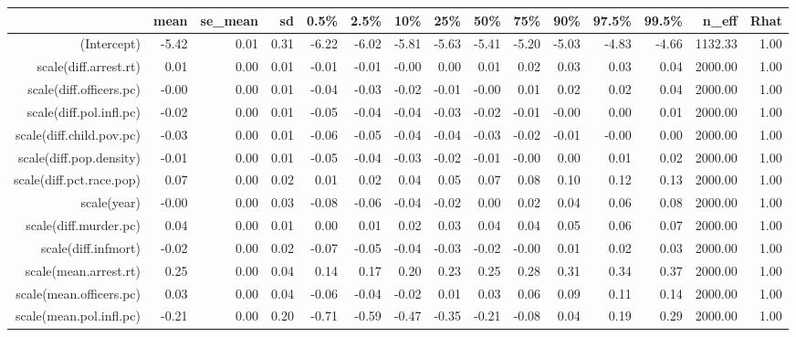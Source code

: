 \begin{table}[ht]
\centering
\begin{tabular}{rrrrrrrrrrrrrrr}
  \hline
 & mean & se\_mean & sd & 0.5\% & 2.5\% & 10\% & 25\% & 50\% & 75\% & 90\% & 97.5\% & 99.5\% & n\_eff & Rhat \\ 
  \hline
(Intercept) & -5.42 & 0.01 & 0.31 & -6.22 & -6.02 & -5.81 & -5.63 & -5.41 & -5.20 & -5.03 & -4.83 & -4.66 & 1132.33 & 1.00 \\ 
  scale(diff.arrest.rt) & 0.01 & 0.00 & 0.01 & -0.01 & -0.01 & -0.00 & 0.00 & 0.01 & 0.02 & 0.03 & 0.03 & 0.04 & 2000.00 & 1.00 \\ 
  scale(diff.officers.pc) & -0.00 & 0.00 & 0.01 & -0.04 & -0.03 & -0.02 & -0.01 & -0.00 & 0.01 & 0.02 & 0.02 & 0.04 & 2000.00 & 1.00 \\ 
  scale(diff.pol.infl.pc) & -0.02 & 0.00 & 0.01 & -0.05 & -0.04 & -0.04 & -0.03 & -0.02 & -0.01 & -0.00 & 0.00 & 0.01 & 2000.00 & 1.00 \\ 
  scale(diff.child.pov.pc) & -0.03 & 0.00 & 0.01 & -0.06 & -0.05 & -0.04 & -0.04 & -0.03 & -0.02 & -0.01 & -0.00 & 0.00 & 2000.00 & 1.00 \\ 
  scale(diff.pop.density) & -0.01 & 0.00 & 0.01 & -0.05 & -0.04 & -0.03 & -0.02 & -0.01 & -0.00 & 0.00 & 0.01 & 0.02 & 2000.00 & 1.00 \\ 
  scale(diff.pct.race.pop) & 0.07 & 0.00 & 0.02 & 0.01 & 0.02 & 0.04 & 0.05 & 0.07 & 0.08 & 0.10 & 0.12 & 0.13 & 2000.00 & 1.00 \\ 
  scale(year) & -0.00 & 0.00 & 0.03 & -0.08 & -0.06 & -0.04 & -0.02 & 0.00 & 0.02 & 0.04 & 0.06 & 0.08 & 2000.00 & 1.00 \\ 
  scale(diff.murder.pc) & 0.04 & 0.00 & 0.01 & 0.00 & 0.01 & 0.02 & 0.03 & 0.04 & 0.04 & 0.05 & 0.06 & 0.07 & 2000.00 & 1.00 \\ 
  scale(diff.infmort) & -0.02 & 0.00 & 0.02 & -0.07 & -0.05 & -0.04 & -0.03 & -0.02 & -0.00 & 0.01 & 0.02 & 0.03 & 2000.00 & 1.00 \\ 
  scale(mean.arrest.rt) & 0.25 & 0.00 & 0.04 & 0.14 & 0.17 & 0.20 & 0.23 & 0.25 & 0.28 & 0.31 & 0.34 & 0.37 & 2000.00 & 1.00 \\ 
  scale(mean.officers.pc) & 0.03 & 0.00 & 0.04 & -0.06 & -0.04 & -0.02 & 0.01 & 0.03 & 0.06 & 0.09 & 0.11 & 0.14 & 2000.00 & 1.00 \\ 
  scale(mean.pol.infl.pc) & -0.21 & 0.00 & 0.20 & -0.71 & -0.59 & -0.47 & -0.35 & -0.21 & -0.08 & 0.04 & 0.19 & 0.29 & 2000.00 & 1.00 \\ 

\end{tabular}
\end{table}
